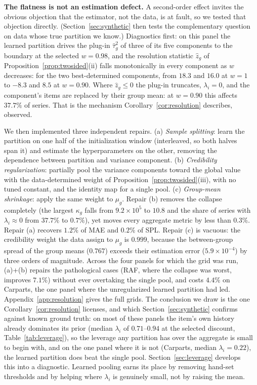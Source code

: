 \documentclass[twocolumn,10pt]{article}
\begin{document}
\textbf{The flatness is not an estimation defect.} A second-order effect
invites the obvious objection that the estimator, not the data, is at
fault, so we tested that objection directly. (Section~\ref{sec:synthetic}
then tests the complementary question on data whose true partition we
know.)
Diagnostics first: on this panel the learned partition drives the plug-in
$\hat\tau_g^2$ of three of its five components to the boundary at the
selected $w=0.98$, and the resolution statistic $\hat z_g$ of
Proposition~\ref{prop:twosided}(ii) falls monotonically in every
component as $w$ decreases: for the two best-determined components,
from $18.3$ and $16.0$ at $w{=}1$ to $-8.3$ and $8.5$ at $w{=}0.90$.
Where $\hat z_g\le0$ the plug-in truncates, $\lambda_i=0$, and the
component's items are replaced by their group mean: at $w{=}0.90$ this
affects $37.7\%$ of series. That is the mechanism
Corollary~\ref{cor:resolution} describes, observed.

We then implemented three independent repairs. (a) \emph{Sample
splitting}: learn the partition on one half of the initialization window
(interleaved, so both halves span it) and estimate the hyperparameters on
the other, removing the dependence between partition and variance
component. (b) \emph{Credibility regularization}: partially pool the
variance components toward the global value with the data-determined
weight of Proposition~\ref{prop:twosided}(iii), with no tuned constant, and
the identity map for a single pool. (c) \emph{Group-mean shrinkage}:
apply the same weight to $\mu_g$. Repair (b) removes the collapse
completely (the largest $\kappa_g$ falls from $9.2\times10^{5}$ to
$10.8$ and the share of series with $\lambda_i\!\approx\!0$ from
$37.7\%$ to $0.7\%$), yet moves every aggregate metric by less than
$0.3\%$. Repair (a) recovers $1.2\%$ of MAE and $0.2\%$ of SPL. Repair
(c) is vacuous: the credibility weight the data assign to $\mu_g$ is
$0.999$, because the between-group spread of the group means
($0.767$) exceeds their estimation error ($5.9\times10^{-4}$) by three
orders of magnitude. Across the four panels for which the grid was run,
(a)+(b) repairs the pathological cases (RAF, where the collapse was
worst, improves $7.1\%$) without ever overtaking the single pool, and
costs $4.4\%$ on Carparts, the one panel where the unregularized learned
partition had led. Appendix~\ref{app:resolution} gives the full grids.
The conclusion we draw is the one
Corollary~\ref{cor:resolution} licenses, and which
Section~\ref{sec:synthetic} confirms against known ground truth: on most
of these panels the item's own history already dominates its prior
(median $\lambda_i$ of $0.71$--$0.94$ at the selected discount,
Table~\ref{tab:leverage}), so the leverage any partition has over the
aggregate is small to begin with, and on the one panel where it is not
(Carparts, median $\lambda_i=0.22$), the learned partition does beat the
single pool. Section~\ref{sec:leverage} develops this into a
diagnostic. Learned pooling earns its place by removing hand-set
thresholds and by helping where $\lambda_i$ is genuinely small, not by
raising the mean.
\end{document}
